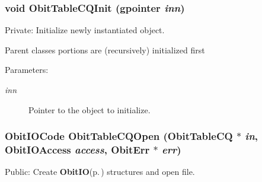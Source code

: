 \subsubsection{\setlength{\rightskip}{0pt plus 5cm}void Obit\-Table\-CQInit (gpointer {\em inn})}\label{ObitTableCQ_8c_a8}


Private: Initialize newly instantiated object. 

Parent classes portions are (recursively) initialized first \begin{Desc}
\item[Parameters:]
\begin{description}
\item[{\em inn}]Pointer to the object to initialize. \end{description}
\end{Desc}
\subsubsection{\setlength{\rightskip}{0pt plus 5cm}Obit\-IOCode Obit\-Table\-CQOpen ({\bf Obit\-Table\-CQ} $\ast$ {\em in}, Obit\-IOAccess {\em access}, {\bf Obit\-Err} $\ast$ {\em err})}\label{ObitTableCQ_8c_a21}


Public: Create {\bf Obit\-IO}{\rm (p.\,\pageref{structObitIO})} structures and open file. 

